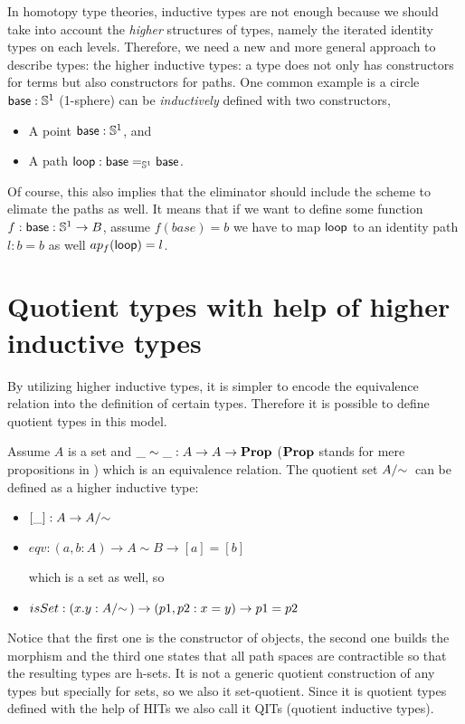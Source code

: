 In homotopy type theories, inductive types are not enough because we
should take into account the \emph{higher} structures of types, namely the iterated identity types on each
levels. Therefore, we need a new and more general approach to describe types: the higher
inductive types: a type does not only has constructors for terms but
also constructors for paths. One common example is a circle
$\base:\Sn^1$ (1-sphere) can be \emph{inductively} defined with two constructors,

\begin{itemize}
\item A point $\base:\Sn^1$, and
\item A path $\lloop : {\id[\Sn^1]\base\base}$.
\end{itemize}

Of course, this also implies that the eliminator should include the
scheme to elimate the paths as well. It means that if we want to
define some function $f : \base:\Sn^1 \rightarrow B$, assume $f(base)=b$ we
have to map $\lloop$ to
an identity path $l : b = b$ as well $ap_f(\lloop)=l$.

\section{Quotient types with help of higher inductive types}

By utilizing higher inductive types, it is simpler to encode the
equivalence relation into the definition of certain types. Therefore
it is possible to define quotient types in this model.

Assume $A$ is a set and $\_\sim\_ : A \rightarrow A \rightarrow \Prop$
($\Prop$ stands for mere propositions in \hott) which is an
equivalence relation. The quotient set $\qset{A}$
can be defined as a higher inductive type:

\begin{itemize}
\item $[\_] : A \rightarrow \qset{A}$
\item $eqv : (a,b : A) \rightarrow A \sim B \rightarrow  [a] =  [b]$

which is a set as well, so

\item $isSet : (x.y:\qset{A}) \rightarrow (p1,p2 : x = y) \rightarrow p1 = p2$

\end{itemize}

Notice that the first one is the constructor of objects, the second
one builds the morphism and the third one states that all path spaces
are contractible so that the resulting types are h-sets. It is not a
generic quotient construction of any types but specially for sets, so
we also it set-quotient. Since it is quotient types defined with the
help of HITs we also call it QITs (quotient inductive types).


